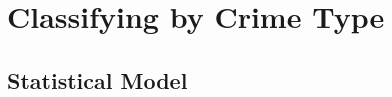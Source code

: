 \documentclass[12pt,a4paper,twoside,openright]{report}
\begin{document}


\section{Classifying by Crime Type}
\label{sections:ctcomp}
\subsection{Statistical Model}
\end{document}
